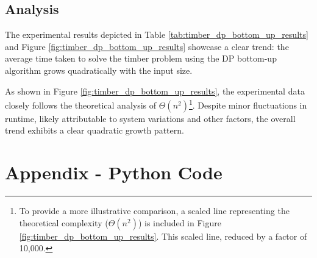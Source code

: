 \documentclass[12pt]{article}
\begin{document}
\subsection{Analysis}
The experimental results depicted in Table \ref{tab:timber_dp_bottom_up_results} and Figure \ref{fig:timber_dp_bottom_up_results} showcase a clear trend: the average time taken to solve the timber problem using the DP bottom-up algorithm grows quadratically with the input size.

As shown in Figure \ref{fig:timber_dp_bottom_up_results}, the experimental data closely follows the theoretical analysis of $\Theta(n^2)$\footnote{To provide a more illustrative comparison, a scaled line representing the theoretical complexity ($\Theta(n^2)$) is included in Figure \ref{fig:timber_dp_bottom_up_results}. This scaled line, reduced by a factor of 10,000.}. Despite minor fluctuations in runtime, likely attributable to system variations and other factors, the overall trend exhibits a clear quadratic growth pattern.


\pagebreak
\section{Appendix - Python Code}
\end{document}
